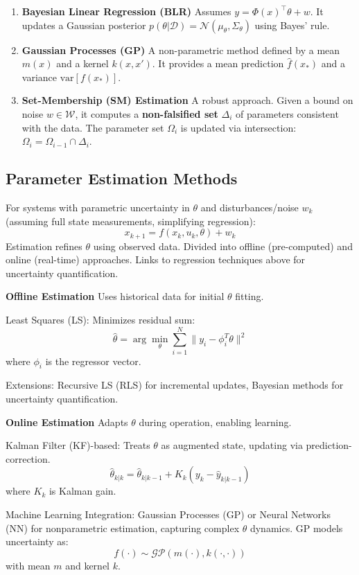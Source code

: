 \begin{enumerate}
  \item
    \textbf{Bayesian Linear Regression (BLR)}
    Assumes $y = \Phi(x)^\top \theta + w$.
    It updates a Gaussian posterior
    $p(\theta | \mathcal{D}) = \mathcal{N}(\mu_\theta, \Sigma_\theta)$
    using Bayes' rule.
  \item
    \textbf{Gaussian Processes (GP)}
    A non-parametric method
    defined by a mean $m(x)$ and a kernel $k(x, x')$.
    It provides a mean prediction $\hat{f}(x_*)$
    and a variance $\text{var}[f(x_*)]$.
  \item
    \textbf{Set-Membership (SM) Estimation}
    A robust approach.
    Given a bound on noise $w \in \mathcal{W}$,
    it computes a \textbf{non-falsified set} $\Delta_i$
    of parameters consistent with the data.
    The parameter set $\Omega_i$ is updated via intersection:
    $\Omega_i = \Omega_{i-1} \cap \Delta_i$.
\end{enumerate}

\subsection{Parameter Estimation Methods}

For systems with parametric uncertainty in $\theta$ and
disturbances/noise $w_k$ (assuming full state measurements,
simplifying regression):
\[
  x_{k+1} = f(x_k, u_k, \theta) + w_k
\]
Estimation refines $\theta$ using observed data. Divided into offline
(pre-computed) and online (real-time) approaches. Links to regression
techniques above for uncertainty quantification.

\textbf{Offline Estimation}
Uses historical data for initial $\theta$ fitting.

Least Squares (LS): Minimizes residual sum:
$$
\hat{\theta} = \arg\min_{\theta} \sum_{i=1}^N \| y_i - \phi_i^T \theta \|^2
$$
where $\phi_i$ is the regressor vector.

Extensions:
Recursive LS (RLS) for incremental updates,
Bayesian methods for uncertainty quantification.

\textbf{Online Estimation}
Adapts $\theta$ during operation, enabling learning.

Kalman Filter (KF)-based:
Treats $\theta$ as augmented state, updating via prediction-correction.
\[
  \hat{\theta}_{k|k} = \hat{\theta}_{k|k-1} + K_k (y_k - \hat{y}_{k|k-1})
\]
where $K_k$ is Kalman gain.

Machine Learning Integration:
Gaussian Processes (GP) or Neural Networks (NN)
for nonparametric estimation,
capturing complex $\theta$ dynamics.
GP models uncertainty as:
\[
  f(\cdot) \sim \mathcal{GP}(m(\cdot), k(\cdot, \cdot))
\]
with mean $m$ and kernel $k$.


